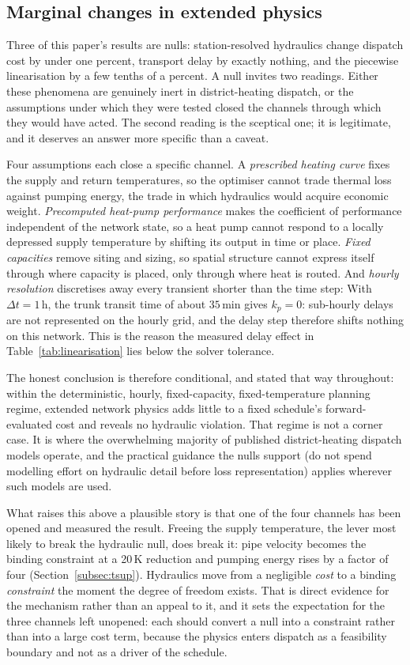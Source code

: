 
\subsection{Marginal changes in extended physics}
\label{subsec:whynull}

Three of this paper's results are nulls: station-resolved hydraulics change dispatch cost
by under one percent, transport delay by exactly nothing, and the piecewise linearisation
by a few tenths of a percent. A null invites two readings. Either these phenomena are
genuinely inert in district-heating dispatch, or the assumptions under which they were tested
closed the channels through which they would have acted. The second reading is the
sceptical one; it is legitimate, and it deserves an answer more specific than a caveat.

Four assumptions each close a specific channel. A \emph{prescribed heating curve} fixes the
supply and return temperatures, so the optimiser cannot trade thermal loss against pumping
energy, the trade in which hydraulics would acquire economic weight. \emph{Precomputed
heat-pump performance} makes the coefficient of performance independent of the network
state, so a heat pump cannot respond to a locally depressed supply temperature by shifting
its output in time or place. \emph{Fixed capacities} remove siting and sizing, so spatial
structure cannot express itself through where capacity is placed, only through where heat
is routed. And \emph{hourly resolution} discretises away every transient shorter than the
time step: With $\Delta t = 1$\,h, the trunk transit time of about $35$\,min gives $k_p = 0$: sub-hourly
delays are not represented on the hourly grid, and the delay step therefore shifts nothing on
this network. This is the reason the measured delay effect in
Table~\ref{tab:linearisation} lies below the solver tolerance.

The honest conclusion is therefore conditional, and stated that way throughout: within
the deterministic, hourly, fixed-capacity, fixed-temperature planning regime, extended
network physics adds little to a fixed schedule's forward-evaluated cost and reveals no
hydraulic violation. That regime is not a corner case. It is
where the overwhelming majority of published district-heating dispatch models operate, and
the practical guidance the nulls support (do not spend modelling effort on hydraulic
detail before loss representation) applies wherever such models are used.

What raises this above a plausible story is that one of the four channels has been opened
and measured the result. Freeing the supply temperature, the lever most likely to break the
hydraulic null, does break it: pipe velocity becomes the binding constraint at a 20\,K
reduction and pumping energy rises by a factor of four
(Section~\ref{subsec:tsup}). Hydraulics move from a negligible \emph{cost} to a binding
\emph{constraint} the moment the degree of freedom exists. That is direct evidence for the
mechanism rather than an appeal to it, and it sets the expectation for the three channels
left unopened: each should convert a null into a constraint rather than into a large cost
term, because the physics enters dispatch as a feasibility boundary and not as a driver of
the schedule.

